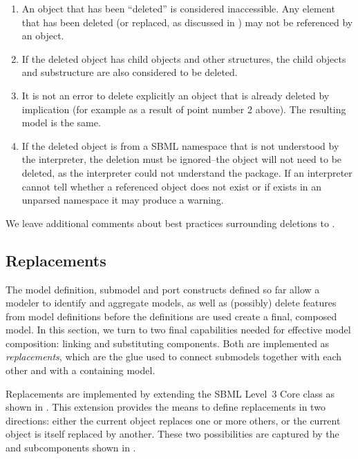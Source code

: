 \begin{enumerate}

\item An object that has been ``deleted'' is considered inaccessible.
  Any element that has been deleted (or replaced, as discussed in
  ) may not be referenced by an \SBaseRef object.

\item If the deleted object has child objects and other structures, the
  child objects and substructure are also considered to be deleted.

\item It is not an error to delete explicitly an object that is already
  deleted by implication (for example as a result of point number 2
  above).  The resulting model is the same.

\item If the deleted object is from a SBML namespace that is not
  understood by the interpreter, the deletion must be ignored--the 
  object will not need to be deleted, as the interpreter could not
  understand the package.  If an interpreter cannot tell whether 
  a referenced object does not exist or if exists in an unparsed namespace
  it may produce a warning.

\end{enumerate}

We leave additional comments about best practices surrounding deletions
to .

\clearpage


\subsection{Replacements}
\label{replacements}
\label{extended-sbase-class}

The model definition, submodel and port constructs defined so far allow
a modeler to identify and aggregate models, as well as (possibly) delete
features from model definitions before the definitions are used create a
final, composed model.  In this section, we turn to two final
capabilities needed for effective model composition: linking and
substituting components.  Both are implemented as \emph{replacements},
which are the glue used to connect submodels together with each other
and with a containing model.

Replacements are implemented by extending the SBML Level~3 Core \SBase
class as shown in .  This extension provides the
means to define replacements in two directions: either the current
object replaces one or more others, or the current object is itself
replaced by another.  These two possibilities are captured by the
 and  subcomponents
shown in .

